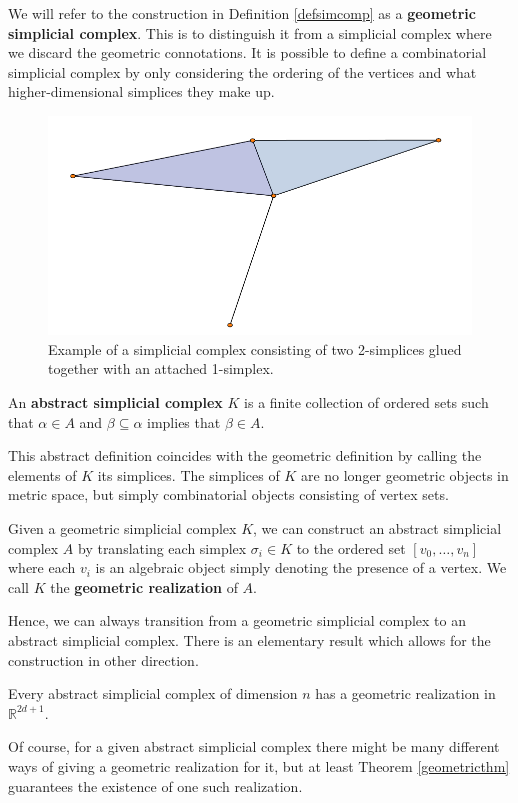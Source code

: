 We will refer to the construction in Definition \ref{defsimcomp} as a \textbf{geometric simplicial complex}. This is to distinguish it from a simplicial complex where we discard the geometric connotations. It is possible to define a combinatorial simplicial complex by only considering the ordering of the vertices and what higher-dimensional simplices they make up.

\begin{figure}
  \centering
  \includegraphics[scale=0.7]{complex.pdf}
  \caption{ \label{complex2} Example of a simplicial complex consisting of two 2-simplices glued together with an attached 1-simplex.}
\end{figure}

\begin{definition}
An \textbf{abstract simplicial complex} $K$ is a finite collection of ordered sets such that $\alpha \in A$ and $\beta \subseteq \alpha$ implies that $\beta \in A$.
\end{definition}

This abstract definition coincides with the geometric definition by calling the elements of $K$ its simplices. The simplices of $K$ are no longer geometric objects in metric space, but simply combinatorial objects consisting of vertex sets.

\begin{definition}
Given a geometric simplicial complex $K$, we can construct an abstract simplicial complex $A$ by translating each simplex $\sigma_{i} \in K$ to the ordered set $[v_{0},\dots,v_{n}]$ where each $v_{i}$ is an algebraic object simply denoting the presence of a vertex. We call $K$ the \textbf{geometric realization} of $A$.
\end{definition}
Hence, we can always transition from a geometric simplicial complex to an abstract simplicial complex. There is an elementary result which allows for the construction in other direction.
\begin{theorem}\label{geometricthm}
Every abstract simplicial complex of dimension $n$ has a geometric realization in $\mathbb{R}^{2d+1}$.
\end{theorem}
Of course, for a given abstract simplicial complex there might be many different ways of giving a geometric realization for it, but at least Theorem \ref{geometricthm} guarantees the existence of one such realization.

